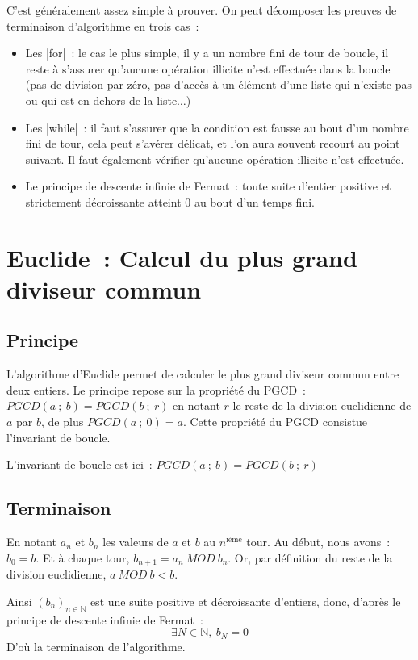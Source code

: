		C'est généralement assez simple à prouver. On peut décomposer les preuves de terminaison d'algorithme en trois cas~:
		\begin{itemize}
			\item Les \python|for|~: le cas le plus simple, il y a un nombre fini de tour de boucle, il reste à s'assurer qu'aucune opération illicite n'est effectuée dans la boucle (pas de division par zéro, pas d'accès à un élément d'une liste qui n'existe pas ou qui est en dehors de la liste$\ldots$)
			\item Les \python|while|~: il faut s'assurer que la condition est fausse au bout d'un nombre fini de tour, cela peut s'avérer délicat, et l'on aura souvent recourt au point suivant. Il faut également vérifier qu'aucune opération illicite n'est effectuée.
			\item Le principe de descente infinie de Fermat~: toute suite d'entier positive et strictement décroissante atteint 0 au bout d'un temps fini.
		\end{itemize}

\section{Euclide~: Calcul du plus grand diviseur commun} \label{pgcd}
	
	\subsection{Principe}
	
		L'algorithme d'Euclide permet de calculer le plus grand diviseur commun entre deux entiers. Le principe repose sur la propriété du PGCD~: $PGCD(a~;\ b) = PGCD(b~;\ r)$ en notant $r$ le reste de la division euclidienne de $a$ par $b$, de plus $PGCD(a~;\ 0) = a$. Cette propriété du PGCD consistue l'invariant de boucle.
		
		L'invariant de boucle est ici~: $PGCD(a~;\ b) = PGCD(b~;\ r)$
	
	\subsection{Terminaison}
		
		En notant $a_n$ et $b_n$ les valeurs de $a$ et $b$ au $n^{\textrm{ième}}$ tour. Au début, nous avons~: $b_0 = b$. Et à chaque tour, $b_{n + 1} = a_n \ MOD\ b_n$. Or, par définition du reste de la division euclidienne, $a \ MOD\ b < b$.
		
		Ainsi $(b_n)_{n \in \mathbb{N}}$ est une suite positive et décroissante d'entiers, donc, d'après le principe de descente infinie de Fermat~:
		\[
			\exists N \in \mathbb{N},\ b_N = 0
		\]
		D'où la terminaison de l'algorithme.
		
